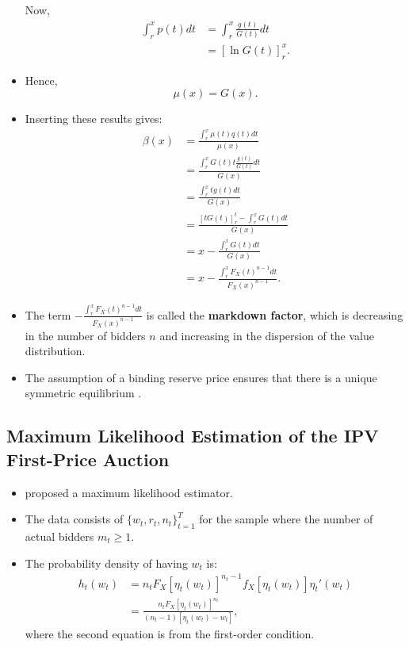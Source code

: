 \documentclass[]{book}
\providecommand{\tightlist}{%
  \setlength{\itemsep}{0pt}\setlength{\parskip}{0pt}}
\begin{document}
\begin{itemize}
  Now, \[
  \begin{split}
  \int_{r}^x p(t) dt &= \int_{r}^x \frac{g(t)}{G(t)} dt\\
  &= [\ln G(t)]_r^x.
  \end{split}
  \]
\item
  Hence, \[
  \mu(x) = G(x).
  \]
\item
  Inserting these results gives: \[
  \begin{split}
  \beta(x) &= \frac{\int_r^x \mu(t) q(t) dt}{\mu(x)}\\
  &= \frac{\int_r^x G(t) t \frac{g(t)}{G(t)} dt}{G(x)}\\
  &= \frac{\int_r^x t g(t) dt}{G(x)}\\
  &= \frac{[t G(t)]_r^t - \int_{r}^x G(t) dt }{G(x)}\\
  &= x - \frac{\int_r^x G(t) dt}{G(x)}\\
  &= x - \frac{\int_r^x F_X(t)^{n - 1} dt}{F_X(x)^{n - 1}}.
  \end{split}
  \]
\item
  The term \(- \frac{\int_r^x F_X(t)^{n - 1} dt}{F_X(x)^{n - 1}}\) is
  called the \textbf{markdown factor}, which is decreasing in the number
  of bidders \(n\) and increasing in the dispersion of the value
  distribution.
\item
  The assumption of a binding reserve price ensures that there is a
  unique symmetric equilibrium \citep{atheyChapter60Nonparametric2007}.
\end{itemize}

\subsection{Maximum Likelihood Estimation of the IPV First-Price
Auction}\label{maximum-likelihood-estimation-of-the-ipv-first-price-auction}

\begin{itemize}
\tightlist
\item
  \citet{donaldPiecewisePseudoMaximumLikelihood1993} proposed a maximum
  likelihood estimator.
\item
  The data consists of \(\{w_t, r_t, n_t\}_{t = 1}^T\) for the sample
  where the number of actual bidders \(m_t \ge 1\).
\item
  The probability density of having \(w_t\) is: \[
  \begin{split}
  h_t(w_t) &= n_t F_X[\eta_t(w_t)]^{n_t - 1} f_X[\eta_t(w_t)] \eta_t'(w_t)\\
  &= \frac{n_t F_X[\eta_t(w_t)]^{n_t}}{(n_t - 1)[\eta_t(w_t) - w_t]},
  \end{split}
  \] where the second equation is from the first-order condition.
\end{itemize}
\end{document}
